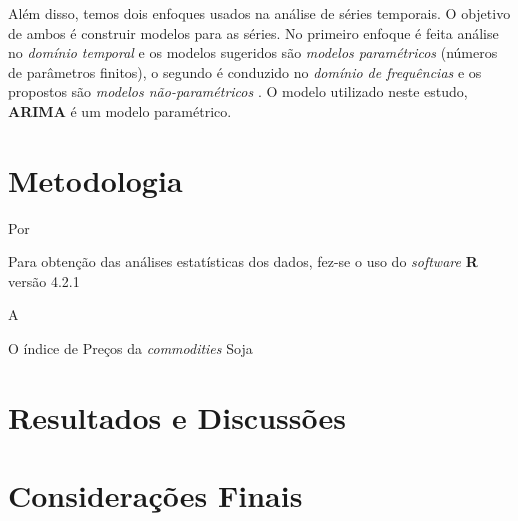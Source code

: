 \documentclass[
	12pt,				%
	openright,			%
	oneside,      %
	a4paper,			%
	english,			%
	french,				%
	spanish,			%
	brazil,				%
	]{abntex2}\usepackage[]{graphicx}\usepackage[]{xcolor}
\begin{document}
Além disso, temos dois enfoques usados na análise de séries temporais. O objetivo de ambos é construir modelos para as séries. No primeiro enfoque é feita análise no \textit{domínio temporal} e os modelos sugeridos são \textit{modelos paramétricos} (números de parâmetros finitos), o segundo é conduzido no \textit{domínio de frequências} e os propostos são 
\textit{modelos não-paramétricos} \cite{morettin2006analise}. O modelo utilizado neste 
estudo, \textbf{ARIMA} é um modelo paramétrico.


  
  
  
  
  \section{}
  
      \subsection{}




  \section{}





\chapter{Metodologia}

Por 


Para obtenção das análises estatísticas dos dados, fez-se o uso do \textit{software} \textbf{R} versão 4.2.1


A 


O índice de Preços da \textit{commodities} Soja 




\chapter{Resultados e Discussões}





\chapter{Considerações Finais}


\end{document}
